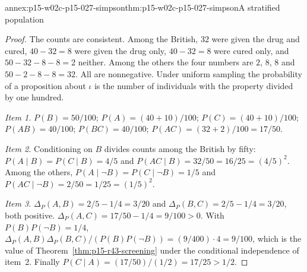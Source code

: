 \begin{annexitem}{annex:p15-w02c-p15-027-simpson}{thm:p15-w02c-p15-027-simpson}{A stratified population}
\begin{proof}
The counts are consistent. Among the British, \(32\) were given the drug
and cured, \(40-32=8\) were given the drug only, \(40-32=8\) were cured
only, and \(50-32-8-8=2\) neither. Among the others the four numbers are
\(2\), \(8\), \(8\) and \(50-2-8-8=32\). All are nonnegative. Under
uniform sampling the probability of a proposition about \(\iota\) is the
number of individuals with the property divided by one hundred.

\emph{Item 1.} \(P(B)=50/100\); \(P(A)=(40+10)/100\);
\(P(C)=(40+10)/100\); \(P(AB)=40/100\); \(P(BC)=40/100\);
\(P(AC)=(32+2)/100=17/50\).

\emph{Item 2.} Conditioning on \(B\) divides counts among the British
by fifty: \(P(A\mid B)=P(C\mid B)=4/5\) and
\(P(AC\mid B)=32/50=16/25=(4/5)^2\). Among the others,
\(P(A\mid\neg B)=P(C\mid\neg B)=1/5\) and
\(P(AC\mid\neg B)=2/50=1/25=(1/5)^2\).

\emph{Item 3.} \(\Delta_P(A,B)=2/5-1/4=3/20\) and
\(\Delta_P(B,C)=2/5-1/4=3/20\), both positive.
\(\Delta_P(A,C)=17/50-1/4=9/100>0\). With \(P(B)P(\neg B)=1/4\),
\(\Delta_P(A,B)\Delta_P(B,C)/(P(B)P(\neg B))=(9/400)\cdot4=9/100\),
which is the value of Theorem~\ref{thm:p15-r43-screening} under the
conditional independence of item~2. Finally
\(P(C\mid A)=(17/50)/(1/2)=17/25>1/2\).
\end{proof}
\end{annexitem}

